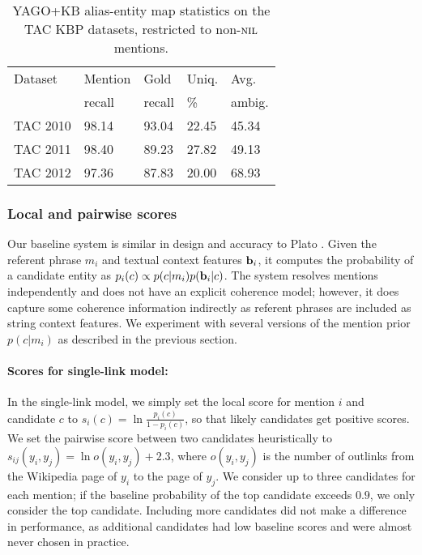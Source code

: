 \begin{table}
  \centering
  \begin{tabular}{l|l|l|l|l}
    Dataset  & Mention &   Gold  & Uniq.  & Avg.  \\
       & recall  & recall  & \%     & ambig. \\
    \hline
    TAC 2010 &  98.14 &  93.04 &  22.45 & 45.34 \\
    \hline
    TAC 2011  & 98.40 & 89.23 & 27.82 & 49.13 \\
    \hline
    TAC 2012  & 97.36 &  87.83 & 20.00  & 68.93
  \end{tabular}
  \caption{YAGO+KB alias-entity map statistics on the TAC KBP datasets, restricted to non-$\mbox{\textsc{nil}}$ mentions.}
  \label{tab:TACAliasTable}
\end{table}


\subsubsection{Local and pairwise scores}
\label{sec:expt:features}

Our baseline system is similar in design and accuracy to Plato \cite{Lazic2015}.
Given the referent phrase $m_i$ and textual context features ${\bf b}_i$, it computes
the probability of a candidate entity as $p_i(c) \propto p(c|m_i)p({\bf b}_i|c)$. 
The system resolves mentions independently and does not have an explicit coherence model;
however, it does capture some coherence information indirectly as referent phrases are
included as string context features. We experiment with several versions of the
mention prior $p(c|m_i)$ as described in the previous section.


\paragraph*{Scores for single-link model:}
In the single-link model, we simply set the local score for
mention $i$ and candidate $c$ to $s_i(c) = \ln \frac{p_i(c )}{1 -
p_i(c)}$, so that likely candidates get positive
scores.  We set the pairwise score between two candidates heuristically to
$s_{ij}(y_i, y_j) = \ln o(y_i, y_j) + 2.3$, where $o(y_i, y_j)$ is the number of
outlinks from the Wikipedia page of $y_i$ to the page of $y_j$.  We
consider up to three candidates for each mention; if the baseline
probability of the top candidate exceeds $0.9$, we only consider the top
candidate. Including more candidates did not make a difference in performance,
as additional candidates had low baseline scores and were almost never chosen
in practice.


